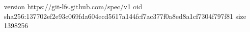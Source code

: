 version https://git-lfs.github.com/spec/v1
oid sha256:137702ef2e93c069fda604ecd5617a144fcf7ac377f0a8ed8a1cf7304f797f81
size 1398256
